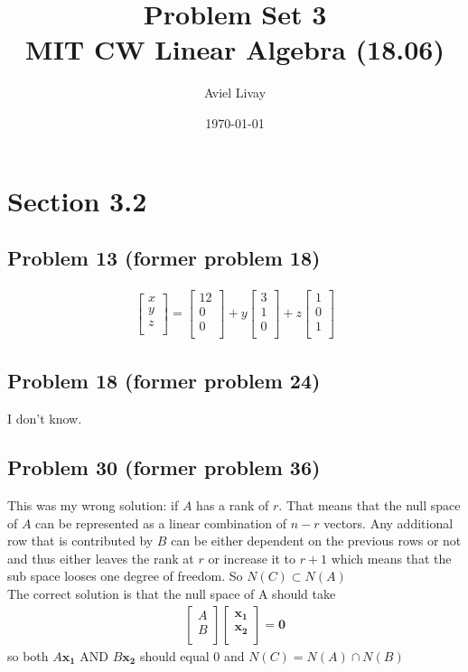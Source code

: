 \documentclass[a4paper,11pt]{article}
\title{%
	Problem Set 3\\
	\large MIT CW Linear Algebra (18.06)
}
\author{Aviel Livay}
\date{\today}
\newcommand{\mybf}[1]{\boldsymbol{#1}}
\begin{document}
\maketitle


\section*{Section 3.2}
\subsection*{Problem 13 (former problem 18)} 
\begin{align}
\begin{bmatrix}
x \\
y \\
z \\
\end{bmatrix}
=
\begin{bmatrix}
12 \\
0 \\
0 \\
\end{bmatrix}
+y
\begin{bmatrix}
3 \\
1 \\
0 \\
\end{bmatrix}
+z
\begin{bmatrix}
1 \\
0 \\
1 \\
\end{bmatrix}
\end{align}
\subsection*{Problem 18 (former problem 24)} 
I don't know.
\subsection*{Problem 30 (former problem 36)} 
This was my wrong solution: if $A$ has a rank of $r$. That means that the null space of $A$ can be represented as a linear combination of $n-r$ vectors. Any additional row that is contributed by $B$ can be either dependent on the previous rows or not and thus either leaves the rank at $r$ or increase it to $r+1$ which means that the sub space looses one degree of freedom. So $N(C) \subset N(A)$\\
The correct solution is that the null space of A should take 
\begin{align}
\begin{bmatrix}
A  \\
B  \\
\end{bmatrix} 
\begin{bmatrix}
\mybf{x_1}  \\
\mybf{x_2}  \\
\end{bmatrix}
= \mybf{0}
\end{align}
so both $A\mybf{x_1}$ AND $B\mybf{x_2}$ should equal 0 and $N(C) = N(A)  \cap N(B)$
\end{document}
